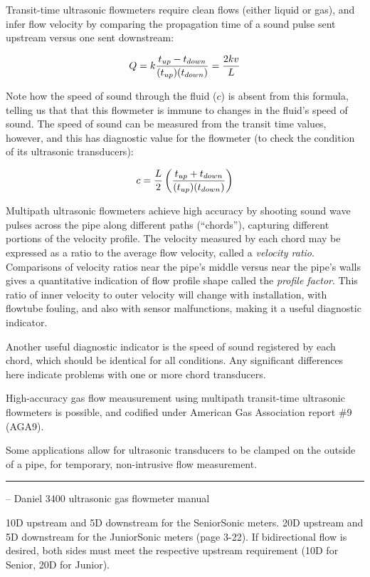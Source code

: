 \begin{itemize}
\begin{itemize}
Transit-time ultrasonic flowmeters require clean flows (either liquid or gas), and infer flow velocity by comparing the propagation time of a sound pulse sent upstream versus one sent downstream:

$$Q = k {t_{up} - t_{down} \over (t_{up})(t_{down})} = {2 k v \over L}$$

Note how the speed of sound through the fluid ($c$) is absent from this formula, telling us that that this flowmeter is immune to changes in the fluid's speed of sound.  The speed of sound can be measured from the transit time values, however, and this has diagnostic value for the flowmeter (to check the condition of its ultrasonic transducers):

$$c = {L \over 2} \left({t_{up} + t_{down} \over (t_{up})(t_{down})}\right)$$

Multipath ultrasonic flowmeters achieve high accuracy by shooting sound wave pulses across the pipe along different paths (``chords''), capturing different portions of the velocity profile.  The velocity measured by each chord may be expressed as a ratio to the average flow velocity, called a {\it velocity ratio}.  Comparisons of velocity ratios near the pipe's middle versus near the pipe's walls gives a quantitative indication of flow profile shape called the {\it profile factor}.  This ratio of inner velocity to outer velocity will change with installation, with flowtube fouling, and also with sensor malfunctions, making it a useful diagnostic indicator.

Another useful diagnostic indicator is the speed of sound registered by each chord, which should be identical for all conditions.  Any significant differences here indicate problems with one or more chord transducers.

\vskip 10pt

High-accuracy gas flow meausurement using multipath transit-time ultrasonic flowmeters is possible, and codified under American Gas Association report \#9 (AGA9).

\vskip 10pt

Some applications allow for ultrasonic transducers to be clamped on the outside of a pipe, for temporary, non-intrusive flow measurement.


\filbreak \vskip 5pt \hrule \vskip 5pt  -- Daniel 3400 ultrasonic gas flowmeter manual \vskip 10pt

10D upstream and 5D downstream for the SeniorSonic meters.  20D upstream and 5D downstream for the JuniorSonic meters (page 3-22).  If bidirectional flow is desired, both sides must meet the respective upstream requirement (10D for Senior, 20D for Junior).


\end{itemize}
\end{itemize}

